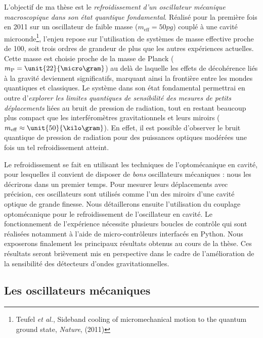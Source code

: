 \documentclass[12pt,a4paper]{article}
\begin{document}
L'objectif de ma thèse est le \textit{refroidissement d'un oscillateur mécanique macroscopique dans son état quantique fondamental}.
Réalisé pour la première fois en 2011 sur un oscillateur de faible masse ($m_\mathrm{eff} = \unit{50}{pg}$) couplé à une cavité microonde\footnote{Teufel \textit{et al.}, Sideband cooling of micromechanical motion to the quantum ground state, \textit{Nature}, (2011)}, l'enjeu repose sur l'utilisation de systèmes de masse effective proche de \unit{100}{\micro\gram}, soit trois ordres de grandeur de plus que les autres expériences actuelles.
Cette masse est choisie proche de la masse de Planck ($m_\mathrm{P}=\unit{22}{\micro\gram}$) au delà de laquelle les effets de décohérence liés à la gravité deviennent significatifs, marquant ainsi la frontière entre les \og mondes \fg{} quantiques et classiques. 
Le système dans son état fondamental permettrai en outre d'\textit{explorer les limites quantiques de sensibilité des mesures de petits déplacements} liées au bruit de pression de radiation, tout en restant beaucoup plus compact que les interféromètres gravitationnels et leurs miroirs ($m_\mathrm{eff}\approx\unit{50}{\kilo\gram}$).
En effet, il est possible d'observer le bruit quantique de pression de radiation pour des puissances optiques modérées une fois un tel refroidissement atteint.

Le refroidissement se fait en utilisant les techniques de l'optomécanique en cavité, pour lesquelles il convient de disposer de \textit{bons} oscillateurs mécaniques : nous les décrirons dans un premier temps.
Pour mesurer leurs déplacements avec précision, ces oscillateurs sont utilisés comme l'un des miroirs d'une cavité optique de grande finesse.
Nous détaillerons ensuite l'utilisation du couplage optomécanique pour le refroidissement de l'oscillateur en cavité.
Le fonctionnement de l'expérience nécessite plusieurs boucles de contrôle qui sont réalisées notamment à l'aide de micro-contrôleurs interfacés en Python.
Nous exposerons finalement les principaux résultats obtenus au cours de la thèse.
Ces résultats seront brièvement mis en perspective dans le cadre de l'amélioration de la sensibilité des détecteurs d'ondes gravitationnelles.

\subsection{Les oscillateurs mécaniques}
\label{sec:mechanical_oscillators}
\end{document}
